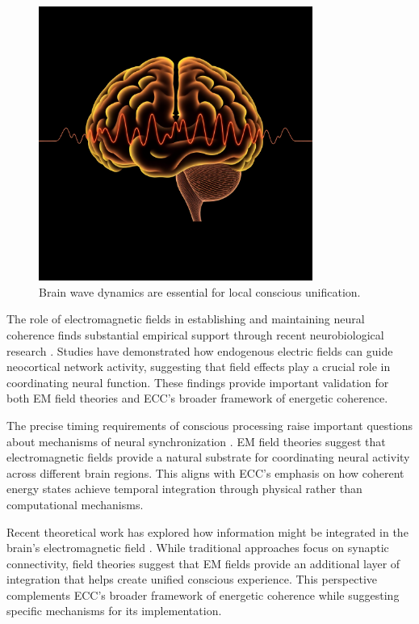 \begin{refsection}
\begin{figure}[h]
    \centering
    \includegraphics[width=0.8\textwidth]{images/brain_waves.png}

    \caption{Brain wave dynamics are essential for local conscious unification.}
\end{figure}

The role of electromagnetic fields in establishing and maintaining neural coherence finds substantial empirical support through recent neurobiological research \cite{Frohlich2010}. Studies have demonstrated how endogenous electric fields can guide neocortical network activity, suggesting that field effects play a crucial role in coordinating neural function. These findings provide important validation for both EM field theories and ECC's broader framework of energetic coherence.

The precise timing requirements of conscious processing raise important questions about mechanisms of neural synchronization \cite{Radman2007}. EM field theories suggest that electromagnetic fields provide a natural substrate for coordinating neural activity across different brain regions. This aligns with ECC's emphasis on how coherent energy states achieve temporal integration through physical rather than computational mechanisms.

Recent theoretical work has explored how information might be integrated in the brain's electromagnetic field \cite{McFadden2020}. While traditional approaches focus on synaptic connectivity, field theories suggest that EM fields provide an additional layer of integration that helps create unified conscious experience. This perspective complements ECC's broader framework of energetic coherence while suggesting specific mechanisms for its implementation.


\end{refsection}
